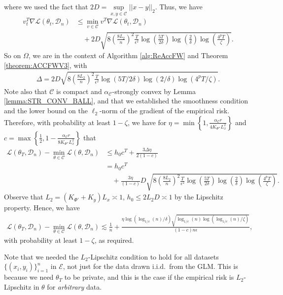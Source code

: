 \documentclass{article}
\newcommand{\iid}{i.i.d.{\ }}
\begin{document}
where we used the fact that $2D = \mathop{\sup}\limits_{x, y \in \mathcal{C}}||x - y||_2$. Thus, we have
\begin{align*}
v_t^T\nabla \mathcal{L}(\theta_t, \mathcal{D}_n) &\leq \mathop{\min}\limits_{v \in \mathcal{C}}v^T\nabla \mathcal{L}(\theta_t, \mathcal{D}_n)\\
& \quad + 2D\sqrt{8\left(\frac{8L_2}{n}\right)^2\frac{T}{\epsilon^2} \log\left(\frac{5T}{2\delta}\right)\log\left(\frac{2}{\delta}\right)\log\left(\frac{4^pT}{\zeta}\right)}.
\end{align*}
So on $\Omega$, we are in the context of Algorithm \ref{alg:ReAccFW} and Theorem \ref{theorem:ACCFWV3}, with
\begin{align*}
\Delta = 2D\sqrt{8\left(\frac{8L_2}{n}\right)^2\frac{T}{\epsilon^2} \log(5T/2\delta)\log(2/\delta)\log(4^pT/\zeta)}.
\end{align*}
Note also that $\mathcal{C}$ is compact and $\alpha_{\mathcal{C}}$-strongly convex by Lemma \ref{lemma:STR_CONV_BALL}, and that we established the smoothness condition and the lower bound on the $\ell_2$-norm of the gradient of the empirical risk. Therefore, with probability at least $1 - \zeta$, we have for $\eta = \min\left\{1, \frac{\alpha_{\mathcal{C}}r}{4K_{\Phi''}L_x^2}\right\}$ and $c = \max\left\{\frac{1}{2}, 1 - \frac{\alpha_{\mathcal{C}}r}{8K_{\Phi''}L_x^2}\right\}$ that
\begin{align*}
\mathcal{L}(\theta_T, \mathcal{D}_n) - \mathop{\min}\limits_{\theta \in \mathcal{C}}\mathcal{L}(\theta, \mathcal{D}_n) &\leq h_0c^T + \frac{3\Delta\eta}{2(1 - c)}\\
&= h_0c^T\\
& \quad + \frac{3\eta}{(1 - c)}D\sqrt{8\left(\frac{8L_2}{n}\right)^2\frac{T}{\epsilon^2} \log\left(\frac{5T}{2\delta}\right)\log\left(\frac{2}{\delta}\right)\log\left(\frac{4^pT}{\zeta}\right)}.
\end{align*}
Observe that $L_2 = (K_{\Phi'} + K_y)L_x \asymp 1$, $h_0 \leq 2L_2D \asymp 1$ by the Lipschitz property. Hence, we have
\begin{align*}
\mathcal{L}(\theta_T, \mathcal{D}_n) - \mathop{\min}\limits_{\theta \in \mathcal{C}}\mathcal{L}(\theta, \mathcal{D}_n) \lesssim \frac{1}{n} + \frac{\eta\log\left(\log_{1/c}(n)/\delta\right)\sqrt{\log_{1/c}(n)\log\left(\log_{1/c}(n)/\zeta\right)}}{(1 - c)n\epsilon},
\end{align*}
with probability at least $1 - \zeta$, as required.

Note that we needed the $L_2$-Lipschitz condition to hold for all datasets $\{(x_i, y_i)\}_{i = 1}^n$ in $\mathcal{E}$, not just for the data drawn \iid from the GLM. This is because we need $\theta_T$ to be private, and this is the case if the empirical risk is $L_2$-Lipschitz in $\theta$ for \emph{arbitrary} data.
\end{document}
